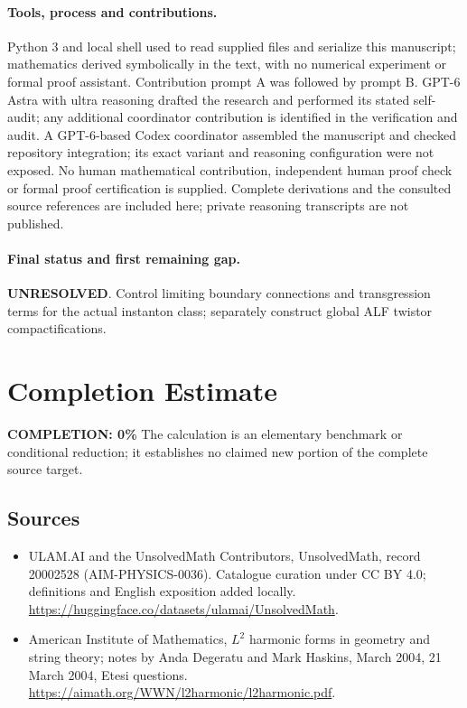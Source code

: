\documentclass[11pt]{article}
\begin{document}
\paragraph{Tools, process and contributions.}
Python 3 and local shell used to read supplied files and serialize this manuscript; mathematics derived symbolically in the text, with no numerical experiment or formal proof assistant. Contribution prompt A was followed by prompt B. GPT-6 Astra with ultra reasoning drafted the research and performed its stated self-audit; any additional coordinator contribution is identified in the verification and audit. A GPT-6-based Codex coordinator assembled the manuscript and checked repository integration; its exact variant and reasoning configuration were not exposed. No human mathematical contribution, independent human proof check or formal proof certification is supplied. Complete derivations and the consulted source references are included here; private reasoning transcripts are not published.

\paragraph{Final status and first remaining gap.}
\textbf{UNRESOLVED}. Control limiting boundary connections and transgression terms for the actual instanton class; separately construct global ALF twistor compactifications.

\section{Completion Estimate}
\noindent\textbf{COMPLETION: 0\%}
The calculation is an elementary benchmark or conditional reduction; it establishes no claimed new portion of the complete source target.

\subsection{Sources}
\begin{itemize}
\item[\hypertarget{source:20002528:1}{S1}] ULAM.AI and the UnsolvedMath Contributors, UnsolvedMath, record 20002528 (AIM-PHYSICS-0036). Catalogue curation under CC BY 4.0; definitions and English exposition added locally.
\url{https://huggingface.co/datasets/ulamai/UnsolvedMath}.
\item[\hypertarget{source:20002528:2}{S2}] American Institute of Mathematics, $L^2$ harmonic forms in geometry and string theory; notes by Anda Degeratu and Mark Haskins, March 2004, 21 March 2004, Etesi questions.
\url{https://aimath.org/WWN/l2harmonic/l2harmonic.pdf}.
\end{itemize}
\label{end:20002528}
\end{document}
